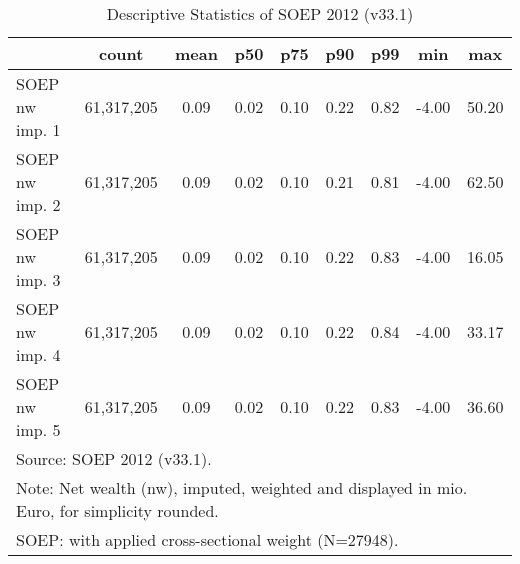 \begin{table}[htbp]\centering
\def\sym#1{\ifmmode^{#1}\else\(^{#1}\)\fi}
\caption{Descriptive Statistics of SOEP 2012 (v33.1)}
\begin{tabular}{l*{1}{cccccccc}}
\hline\hline
                                            &       count&        mean&         p50&         p75&         p90&         p99&         min&         max\\
\hline
SOEP nw imp. 1                              &  61,317,205&        0.09&        0.02&        0.10&        0.22&        0.82&       -4.00&       50.20\\
SOEP nw imp. 2                              &  61,317,205&        0.09&        0.02&        0.10&        0.21&        0.81&       -4.00&       62.50\\
SOEP nw imp. 3                              &  61,317,205&        0.09&        0.02&        0.10&        0.22&        0.83&       -4.00&       16.05\\
SOEP nw imp. 4                              &  61,317,205&        0.09&        0.02&        0.10&        0.22&        0.84&       -4.00&       33.17\\
SOEP nw imp. 5                              &  61,317,205&        0.09&        0.02&        0.10&        0.22&        0.83&       -4.00&       36.60\\
\hline\hline
\multicolumn{9}{l}{\footnotesize Source: SOEP 2012 (v33.1).}\\
\multicolumn{9}{l}{\footnotesize Note: Net wealth (nw), imputed, weighted and displayed in mio. Euro, for simplicity rounded.}\\
\multicolumn{9}{l}{\footnotesize SOEP: with applied cross-sectional weight (N=27948).}\\
\end{tabular}
\end{table}
